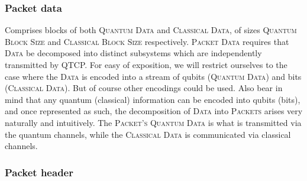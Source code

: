 \documentclass[aps, rmp, twocolumn, amsmath, amssymb, nofootinbib, superscriptaddress, longbibliography, floatfix, table-of-contents, eqsecnum]{revtex4-1}
\begin{document}
%
%

\subsubsection{Packet data} 

Comprises blocks of both \textsc{Quantum Data} and \textsc{Classical Data}, of sizes \textsc{Quantum Block Size} and \textsc{Classical Block Size} respectively. \textsc{Packet Data} requires that \textsc{Data} be decomposed into distinct subsystems which are independently transmitted by QTCP. For easy of exposition, we will restrict ourselves to the case where the \textsc{Data} is encoded into a stream of qubits (\textsc{Quantum Data}) and bits (\textsc{Classical Data}). But of course other encodings could be used. Also bear in mind that any quantum (classical) information can be encoded into qubits (bits), and once represented as such, the decomposition of \textsc{Data} into \textsc{Packets} arises very naturally and intuitively. The \textsc{Packet's} \textsc{Quantum Data} is what is transmitted via the quantum channels, while the \textsc{Classical Data} is communicated via classical channels.

%
%

\subsubsection{Packet header} \label{sec:packet_header} 
\end{document}
